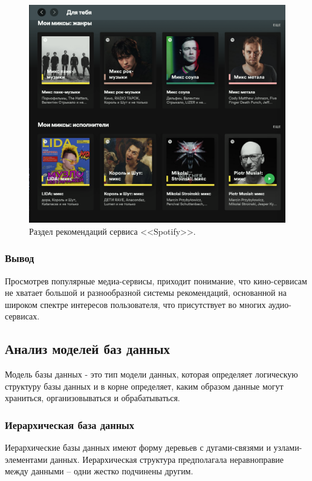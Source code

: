 \begin{figure}[h!]
	\centering
	\includegraphics[scale=0.5]{img/spotify.png}
	\caption{Раздел рекомендаций сервиса <<Spotify>>.}
	\label{img:Spotify}
\end{figure}  
\newpage

\subsubsection{Вывод}
Просмотрев популярные медиа-сервисы, приходит понимание, что кино-сервисам не хватает большой и разнообразной системы рекомендаций, основанной на широком спектре интересов пользователя, что присутствует во многих аудио-сервисах.

\subsection{Анализ моделей баз данных}
Модель базы данных - это тип модели данных, которая определяет логическую структуру базы данных и в корне определяет, каким образом данные могут храниться, организовываться и обрабатываться\cite{modelDB}.

\subsubsection{Иерархическая база данных}
Иерархические базы данных имеют форму деревьев с дугами-связями и узлами-элементами данных. Иерархическая структура предполагала неравноправие между данными – одни жестко подчинены другим\cite{modelDB}.

